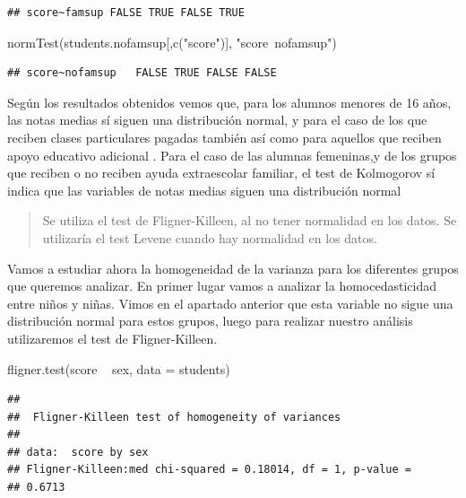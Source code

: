 \documentclass[]{article}
\newenvironment{Shaded}{\begin{snugshade}}{\end{snugshade}}
\newcommand{\DataTypeTok}[1]{\textcolor[rgb]{0.87,0.87,0.75}{#1}}
\newcommand{\KeywordTok}[1]{\textcolor[rgb]{0.94,0.87,0.69}{#1}}
\newcommand{\NormalTok}[1]{\textcolor[rgb]{0.80,0.80,0.80}{#1}}
\newcommand{\OperatorTok}[1]{\textcolor[rgb]{0.94,0.94,0.82}{#1}}
\newcommand{\StringTok}[1]{\textcolor[rgb]{0.80,0.58,0.58}{#1}}
\begin{document}
\begin{verbatim}
## score~famsup FALSE TRUE FALSE TRUE   
\end{verbatim}

\begin{Shaded}
\begin{Highlighting}[]
\KeywordTok{normTest}\NormalTok{(students.nofamsup[,}\KeywordTok{c}\NormalTok{(}\StringTok{"score"}\NormalTok{)], }\StringTok{"score~nofamsup"}\NormalTok{)}
\end{Highlighting}
\end{Shaded}

\begin{verbatim}
## score~nofamsup   FALSE TRUE FALSE FALSE  
\end{verbatim}

Según los resultados obtenidos vemos que, para los alumnos menores de 16
años, las notas medias sí siguen una distribución normal, y para el caso
de los que reciben clases particulares pagadas también así como para
aquellos que reciben apoyo educativo adicional . Para el caso de las
alumnas femeninas,y de los grupos que reciben o no reciben ayuda
extraescolar familiar, el test de Kolmogorov sí indica que las variables
de notas medias siguen una distribución normal

\begin{quote}
Se utiliza el test de Fligner-Killeen, al no tener normalidad en los
datos. Se utilizaría el test Levene cuando hay normalidad en los datos.
\end{quote}

Vamos a estudiar ahora la homogeneidad de la varianza para los
diferentes grupos que queremos analizar. En primer lugar vamos a
analizar la homocedasticidad entre niños y niñas. Vimos en el apartado
anterior que esta variable no sigue una distribución normal para estos
grupos, luego para realizar nuestro análisis utilizaremos el test de
Fligner-Killeen.

\begin{Shaded}
\begin{Highlighting}[]
\KeywordTok{fligner.test}\NormalTok{(score }\OperatorTok{~}\StringTok{ }\NormalTok{sex, }\DataTypeTok{data =}\NormalTok{ students)}
\end{Highlighting}
\end{Shaded}

\begin{verbatim}
## 
##  Fligner-Killeen test of homogeneity of variances
## 
## data:  score by sex
## Fligner-Killeen:med chi-squared = 0.18014, df = 1, p-value =
## 0.6713
\end{verbatim}
\end{document}
